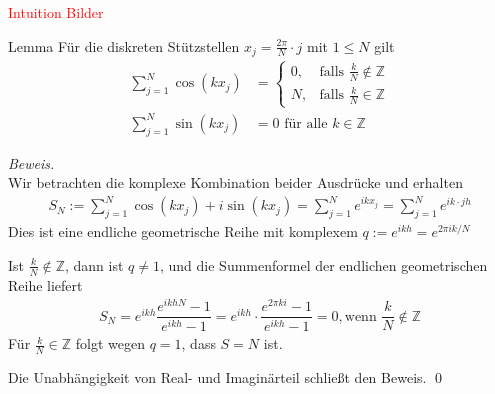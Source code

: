 \textcolor{red}{Intuition Bilder}

\begin{colbox}{Lemma}\label{lem:diskStstelSum}
  Für die diskreten Stützstellen $x_j=\tfrac{2\pi}{N}\cdot j$ mit $1\leq N$  gilt
  \begin{align*}
    \sum_{j=1}^N \cos(kx_j) 
    &= \begin{cases}
      0, & \text{falls } \tfrac{k}{N}\notin\mathbb{Z} \\
      N, & \text{falls } \tfrac{k}{N}\in\mathbb{Z}
    \end{cases} \\
    \sum_{j=1}^N \sin(kx_j) 
    &= 0 \text{ für alle } k\in\mathbb{Z}
  \end{align*}
\end{colbox}

\textit{Beweis.}\\
Wir betrachten die komplexe Kombination beider Ausdrücke und erhalten
%
\begin{align*}
  S_N := \sum_{j=1}^{N} \cos(kx_j) + i\sin(kx_j) = \sum_{j=1}^{N} e^{ikx_j} = \sum_{j=1}^{N} e^{ik\cdot jh}
\end{align*}%
Dies ist eine endliche geometrische Reihe mit komplexem $q := e^{ikh} = e^{2\pi ik/N}$

Ist $\tfrac{k}{N}\notin\mathbb{Z}$, dann ist $q\neq 1$, und die Summenformel der endlichen geometrischen Reihe liefert 
%
\begin{align*}
   S_N 
   = e^{ikh}\dfrac{e^{ikhN}-1}{e^{ikh}-1} 
   = e^{ikh}\cdot\dfrac{e^{2\pi ki}-1}{e^{ikh}-1} 
   = 0, \text{wenn } \dfrac{k}{N}\notin\mathbb{Z}
\end{align*}
%
Für $\tfrac{k}{N}\in\mathbb{Z}$ folgt wegen $q=1$, dass $S=N$ ist. 

Die Unabhängigkeit von Real- und Imaginärteil schließt den Beweis.
\qed

